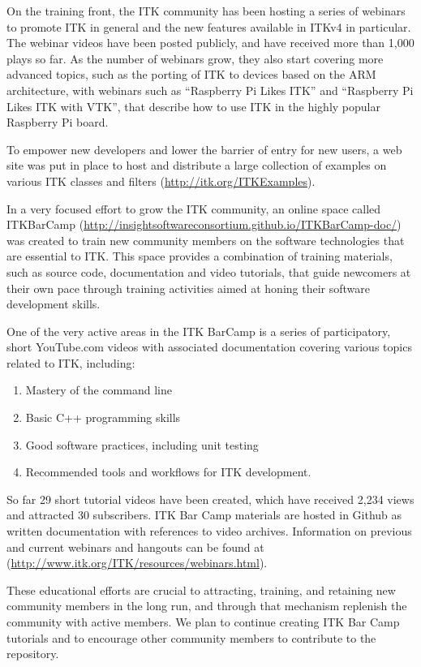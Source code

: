 \documentclass{frontiersENG} %
\begin{document}
On the training front, the ITK community has been hosting a series of webinars
to promote ITK in general and the new features available in ITKv4 in
particular. The webinar videos have been posted publicly, and have received
more than 1,000 plays so far. As the number of webinars grow, they also start
covering more advanced topics, such as the porting of ITK to devices based on
the ARM architecture, with webinars such as ``Raspberry Pi Likes ITK'' and
``Raspberry Pi Likes ITK with VTK'', that describe how to use ITK in the highly
popular Raspberry Pi board.

To empower new developers and lower the barrier of entry for new users, a web
site was put in place to host and distribute a large collection of examples on
various ITK classes and filters (\url{http://itk.org/ITKExamples}).

In a very focused effort to grow the ITK community, an online space called
ITKBarCamp (\url{http://insightsoftwareconsortium.github.io/ITKBarCamp-doc/})
was created to train new community members on the software technologies that
are essential to ITK. This space provides a combination of training materials,
such as source code, documentation and video tutorials, that guide newcomers at
their own pace through training activities aimed at honing their software
development skills.

One of the very active areas in the ITK BarCamp is a series of participatory,
short YouTube.com videos with associated documentation covering various topics
related to ITK, including:

\begin{enumerate}
\item Mastery of the command line
\item Basic C++ programming skills
\item Good software practices, including unit testing
\item Recommended tools and workflows for ITK development.
\end{enumerate}

So far 29 short tutorial videos have been created, which have received 2,234
views and attracted 30 subscribers. ITK Bar Camp materials are hosted in Github
as written documentation with references to video archives. Information on
previous and current webinars and hangouts can be found at
(\url{http://www.itk.org/ITK/resources/webinars.html}).

These educational efforts are crucial to attracting, training, and retaining
new community members in the long run, and through that mechanism replenish the
community with active members. We plan to continue creating ITK Bar Camp
tutorials and to encourage other community members to contribute to the
repository.
\end{document}

